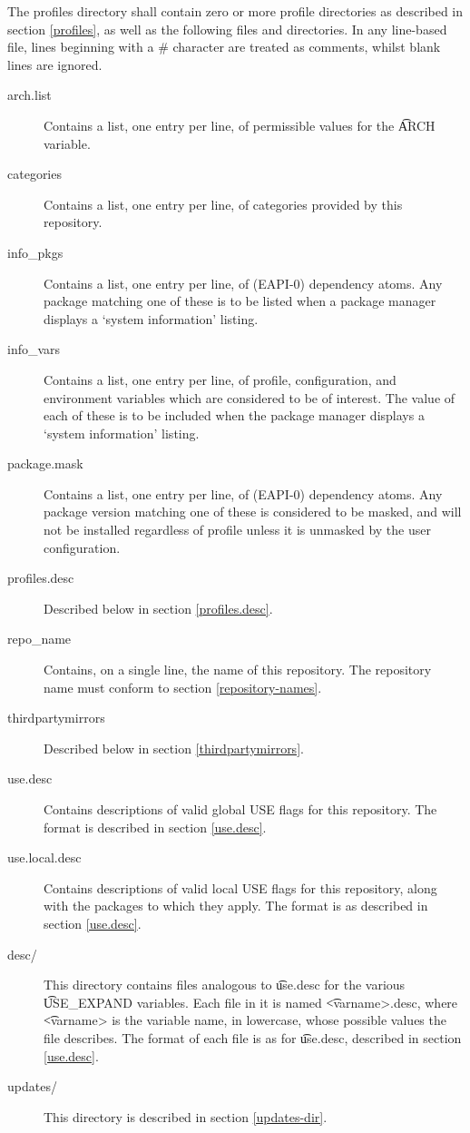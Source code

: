 The profiles directory shall contain zero or more profile directories as described in section
\ref{profiles}, as well as the following files and directories. In any line-based file, lines
beginning with a \# character are treated as comments, whilst blank lines are ignored.
\begin{description}
\item[arch.list] \label{arch.list} Contains a list, one entry per line, of permissible values for
    the \t{ARCH} variable.
\item[categories] \label{profiles-categories} Contains a list, one entry per line, of categories
    provided by this repository.
\item[info\_pkgs] Contains a list, one entry per line, of (EAPI-0) dependency atoms. Any package
    matching one of these is to be listed when a package manager displays a `system information'
    listing.
\item[info\_vars] Contains a list, one entry per line, of profile, configuration, and environment
    variables which are considered to be of interest. The value of each of these is to be included
    when the package manager displays a `system information' listing.
\item[package.mask] \label{profiles-package.mask}
    Contains a list, one entry per line, of (EAPI-0) dependency atoms. Any package
    version matching one of these is considered to be masked, and will not be installed regardless
    of profile unless it is unmasked by the user configuration.
\item[profiles.desc] Described below in section \ref{profiles.desc}.
\item[repo\_name] Contains, on a single line, the name of this repository. The repository name must
    conform to section \ref{repository-names}.
\item[thirdpartymirrors] Described below in section \ref{thirdpartymirrors}.
\item[use.desc] Contains descriptions of valid global USE flags for this repository. The format is
    described in section \ref{use.desc}.
\item[use.local.desc] Contains descriptions of valid local USE flags for this repository, along with
    the packages to which they apply. The format is as described in section \ref{use.desc}.
\item[desc/] This directory contains files analogous to \t{use.desc} for the various \t{USE\_EXPAND}
    variables. Each file in it is named \t{<varname>.desc}, where \t{<varname>} is the variable
    name, in lowercase, whose possible values the file describes. The format of each file is as for
    \t{use.desc}, described in section \ref{use.desc}.
\item[updates/] This directory is described in section \ref{updates-dir}.
\end{description}

